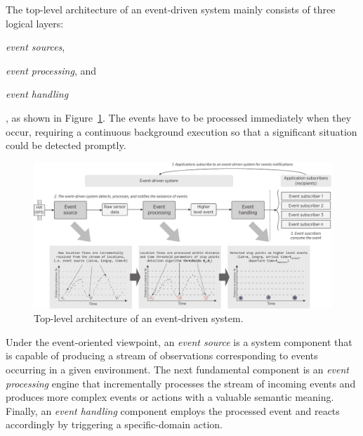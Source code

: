 \documentclass[ENG,PhD]{cinvestav}
\begin{document}
The top-level architecture of an event-driven system mainly consists of three logical layers: 
\begin{listahorizontal}
  \item \emph{event sources},
  \item \emph{event processing}, and
  \item \emph{event handling}
\end{listahorizontal}
, as shown in Figure~\ref{fig:event-based-system-architecture}.
The events have to be processed immediately when they occur, requiring a continuous background execution so that a significant situation could be detected promptly.

\begin{figure}
  \centering
  \includegraphics[width=\textwidth]{vectors/event-driven-system}
  \caption{Top-level architecture of an event-driven system.}
  \label{fig:event-based-system-architecture}
\end{figure}

Under the event-oriented viewpoint, an \emph{event source} is a system component that is capable of producing a stream of observations corresponding to events occurring in a given environment.
The next fundamental component is an \emph{event processing} engine that incrementally processes the stream of incoming events and produces more complex events or actions with a valuable semantic meaning.
Finally, an \emph{event handling} component employs the processed event and reacts accordingly by triggering a specific-domain action.
\end{document}
